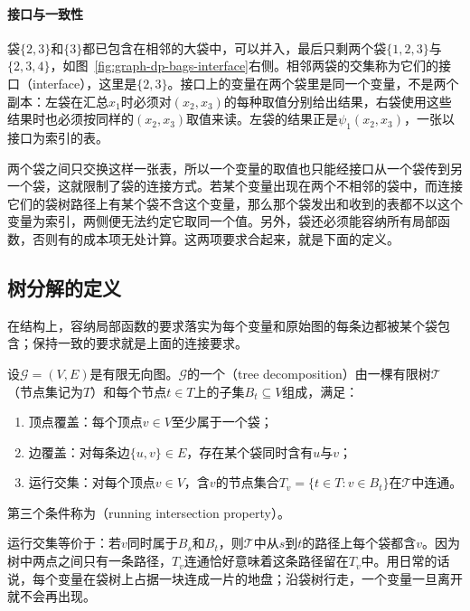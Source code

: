 \paragraph{接口与一致性}
袋$\{2,3\}$和$\{3\}$都已包含在相邻的大袋中，可以并入，最后只剩两个袋$\{1,2,3\}$与$\{2,3,4\}$，如图~\ref{fig:graph-dp-bags-interface}右侧。相邻两袋的交集称为它们的接口（interface），这里是$\{2,3\}$。接口上的变量在两个袋里是同一个变量，不是两个副本：左袋在汇总$x_1$时必须对$(x_2,x_3)$的每种取值分别给出结果，右袋使用这些结果时也必须按同样的$(x_2,x_3)$取值来读。左袋的结果正是$\psi_1(x_2,x_3)$，一张以接口为索引的表。

两个袋之间只交换这样一张表，所以一个变量的取值也只能经接口从一个袋传到另一个袋，这就限制了袋的连接方式。若某个变量出现在两个不相邻的袋中，而连接它们的袋树路径上有某个袋不含这个变量，那么那个袋发出和收到的表都不以这个变量为索引，两侧便无法约定它取同一个值。另外，袋还必须能容纳所有局部函数，否则有的成本项无处计算。这两项要求合起来，就是下面的定义。

\subsection{树分解的定义}
\label{sec:graph-dp-decomposition-definition}

在结构上，容纳局部函数的要求落实为每个变量和原始图的每条边都被某个袋包含；保持一致的要求就是上面的连接要求。

\begin{definition}[树分解]
\label{def:graph-dp-tree-decomposition}
设$\mathcal G=(V,E)$是有限无向图。$\mathcal G$的一个（tree decomposition）由一棵有限树$\mathcal T$（节点集记为$T$）和每个节点$t\in T$上的子集$B_t\subseteq V$组成，满足：
\begin{enumerate}
  \item 顶点覆盖：每个顶点$v\in V$至少属于一个袋；
  \item 边覆盖：对每条边$\{u,v\}\in E$，存在某个袋同时含有$u$与$v$；
  \item 运行交集：对每个顶点$v\in V$，含$v$的节点集合$T_v=\{t\in T:v\in B_t\}$在$\mathcal T$中连通。
\end{enumerate}
第三个条件称为（running intersection property）。
\end{definition}

运行交集等价于：若$v$同时属于$B_s$和$B_t$，则$\mathcal T$中从$s$到$t$的路径上每个袋都含$v$。因为树中两点之间只有一条路径，$T_v$连通恰好意味着这条路径留在$T_v$中。用日常的话说，每个变量在袋树上占据一块连成一片的地盘；沿袋树行走，一个变量一旦离开就不会再出现。

